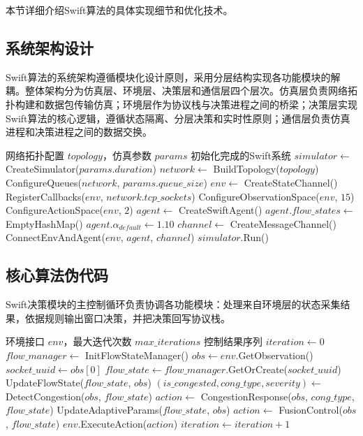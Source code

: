 本节详细介绍Swift算法的具体实现细节和优化技术。

\subsection{系统架构设计}

Swift算法的系统架构遵循模块化设计原则，采用分层结构实现各功能模块的解耦。整体架构分为仿真层、环境层、决策层和通信层四个层次。仿真层负责网络拓扑构建和数据包传输仿真；环境层作为协议栈与决策进程之间的桥梁；决策层实现Swift算法的核心逻辑，遵循状态隔离、分层决策和实时性原则；通信层负责仿真进程和决策进程之间的数据交换。

\begin{algorithm}[htbp]
\caption{Swift系统初始化流程}
\begin{algorithmic}[1]
\Require 网络拓扑配置 $topology$，仿真参数 $params$
\Ensure 初始化完成的Swift系统
\State $simulator \leftarrow$ CreateSimulator($params.duration$)
\State $network \leftarrow$ BuildTopology($topology$)
\State ConfigureQueues($network$, $params.queue\_size$)
\State $env \leftarrow$ CreateStateChannel()
\State RegisterCallbacks($env$, $network.tcp\_sockets$)
\State ConfigureObservationSpace($env$, $15$)
\State ConfigureActionSpace($env$, $2$) 
\State $agent \leftarrow$ CreateSwiftAgent()
\State $agent.flow\_states \leftarrow$ EmptyHashMap()
\State $agent.\alpha_{default} \leftarrow 1.10$
\State $channel \leftarrow$ CreateMessageChannel()
\State ConnectEnvAndAgent($env$, $agent$, $channel$)
\State $simulator$.Run()
\end{algorithmic}
\end{algorithm}

\subsection{核心算法伪代码}

Swift决策模块的主控制循环负责协调各功能模块：处理来自环境层的状态采集结果，依据规则输出窗口决策，并把决策回写协议栈。

\begin{algorithm}[htbp]
\caption{Swift主控制循环}
\begin{algorithmic}[1]
\Require 环境接口 $env$，最大迭代次数 $max\_iterations$
\Ensure 控制结果序列
\State $iteration \leftarrow 0$
\State $flow\_manager \leftarrow$ InitFlowStateManager()
    \State $obs \leftarrow env$.GetObservation()
    \State $socket\_uuid \leftarrow obs[0]$
    \State $flow\_state \leftarrow flow\_manager$.GetOrCreate($socket\_uuid$)
    \State UpdateFlowState($flow\_state$, $obs$)
    \State $(is\_congested, cong\_type, severity) \leftarrow$ DetectCongestion($obs$, $flow\_state$)
        \State $action \leftarrow$ CongestionResponse($obs$, $cong\_type$, $flow\_state$)
    \Else
        \State UpdateAdaptiveParams($flow\_state$, $obs$)
        \State $action \leftarrow$ FusionControl($obs$, $flow\_state$)
    \EndIf
    \State $env$.ExecuteAction($action$)
    \State $iteration \leftarrow iteration + 1$
\EndWhile
\end{algorithmic}
\end{algorithm}

